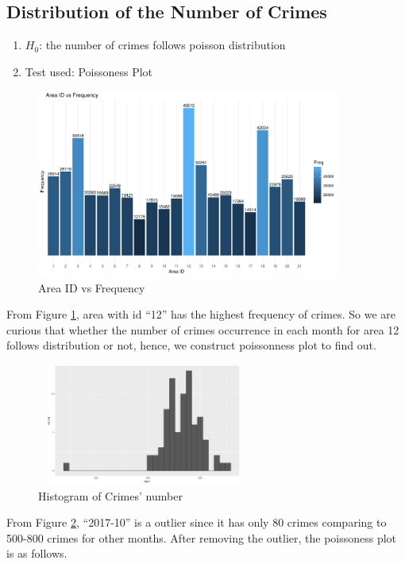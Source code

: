 \documentclass[UTF8]{article}
\begin{document}
\subsection{Distribution of the Number of Crimes}

\begin{enumerate}[-]
    \item $H_0$: the number of crimes follows poisson distribution
    \item Test used: Poissoness Plot
\end{enumerate}

\begin{figure}[htb]
    \includegraphics[width=10cm,height=6.18cm]{../image/4.pdf}
    \caption{Area ID vs Frequency}\label{fig:Frequency} 
\end{figure}

From Figure \ref{fig:Frequency}, area with id “12” has the highest frequency of crimes. So we are curious that whether the number of crimes occurrence in each month for area 12 follows distribution or not, hence, we construct poissonness plot to find out.

\begin{figure}[htb]
    \includegraphics[width=7cm,height=4cm]{../image/5.pdf}
    \caption{Histogram of Crimes' number}\label{fig:outliar} 
\end{figure}


From Figure \ref{fig:outliar}, “2017-10” is a outlier since it has only 80 crimes comparing to 500-800 crimes for other months. After removing the outlier, the poissoness plot is as follows.
\end{document}

